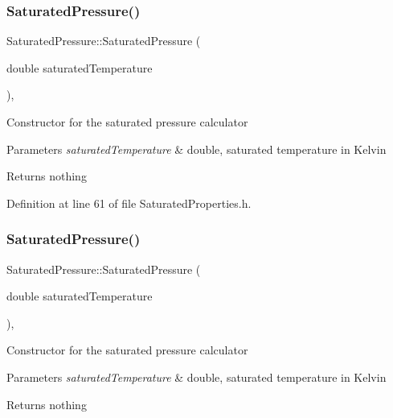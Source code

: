 \subsubsection{\texorpdfstring{Saturated\+Pressure()}{SaturatedPressure()}\hspace{0.1cm}{\footnotesize\ttfamily [1/3]}}
{\footnotesize\ttfamily Saturated\+Pressure\+::\+Saturated\+Pressure (\begin{DoxyParamCaption}\item[{double}]{saturated\+Temperature }\end{DoxyParamCaption})\hspace{0.3cm}{\ttfamily [inline]}, {\ttfamily [explicit]}}

Constructor for the saturated pressure calculator


\begin{DoxyParams}{Parameters}
{\em saturated\+Temperature} & double, saturated temperature in Kelvin\\
\hline
\end{DoxyParams}
\begin{DoxyReturn}{Returns}
nothing 
\end{DoxyReturn}


Definition at line 61 of file Saturated\+Properties.\+h.

\mbox{\label{class_saturated_pressure_a67020b0bb7588c643e12e256fa25e0bc}} 
\subsubsection{\texorpdfstring{Saturated\+Pressure()}{SaturatedPressure()}\hspace{0.1cm}{\footnotesize\ttfamily [2/3]}}
{\footnotesize\ttfamily Saturated\+Pressure\+::\+Saturated\+Pressure (\begin{DoxyParamCaption}\item[{double}]{saturated\+Temperature }\end{DoxyParamCaption})\hspace{0.3cm}{\ttfamily [inline]}, {\ttfamily [explicit]}}

Constructor for the saturated pressure calculator


\begin{DoxyParams}{Parameters}
{\em saturated\+Temperature} & double, saturated temperature in Kelvin\\
\hline
\end{DoxyParams}
\begin{DoxyReturn}{Returns}
nothing 
\end{DoxyReturn}


